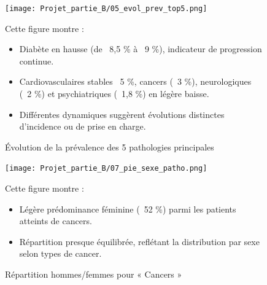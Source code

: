 \documentclass[12pt,a4paper]{article}
\begin{document}
\begin{figure}[H]
  \centering
  \begin{minipage}[t]{0.48\textwidth}
    \centering
    \texttt{[image: Projet\_partie\_B/05\_evol\_prev\_top5.png]}
    \caption{Évolution de la prévalence des 5 pathologies principales}
    \label{fig:evol_prev_top5}
  \end{minipage}
  \hfill
  \begin{minipage}[t]{0.48\textwidth}
    \small
    Cette figure montre :
    \begin{itemize}
      \item Diabète en hausse (de ~8,5 \% à ~9 \%), indicateur de progression continue.  
      \item Cardiovasculaires stables ~5 \%, cancers (~3 \%), neurologiques (~2 \%) et psychiatriques (~1,8 \%) en légère baisse.  
      \item Différentes dynamiques suggèrent évolutions distinctes d’incidence ou de prise en charge.  
    \end{itemize}
  \end{minipage}
\end{figure}

\begin{figure}[H]
  \centering
  \begin{minipage}[t]{0.48\textwidth}
    \centering
    \texttt{[image: Projet\_partie\_B/07\_pie\_sexe\_patho.png]}
    \caption{Répartition hommes/femmes pour « Cancers »}
    \label{fig:pie_sexe}
  \end{minipage}
  \hfill
  \begin{minipage}[t]{0.48\textwidth}
    \small
    Cette figure montre :
    \begin{itemize}
      \item Légère prédominance féminine (~52 \%) parmi les patients atteints de cancers.  
      \item Répartition presque équilibrée, reflétant la distribution par sexe selon types de cancer.  
    \end{itemize}
  \end{minipage}
\end{figure}
\end{document}
